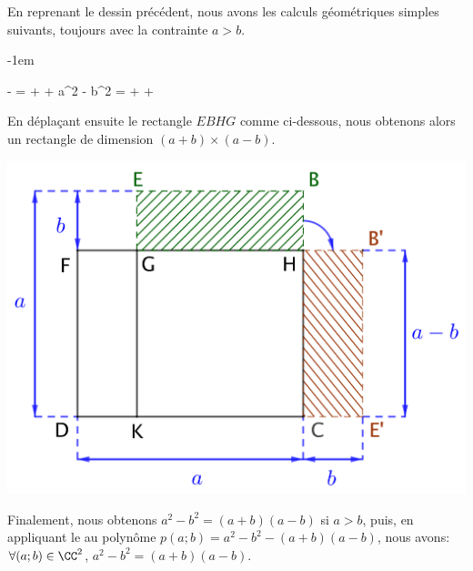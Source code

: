 \begin{example}
	En reprenant le dessin précédent, nous avons les calculs géométriques simples suivants, toujours avec la contrainte $a > b$.

	\smallskip
	\leavevmode\kern-1em%
	\begin{stepcalc}[style=ar*, ope={\iff}]
    	 -  =  +  + 
	\explnext{}
    	a^2 - b^2 =  +  + 
	\end{stepcalc}
	\smallskip

	En déplaçant ensuite le rectangle $EBHG$ comme ci-dessous, nous obtenons alors un rectangle de dimension $(a+b) \times (a-b)$. 

	\begin{center}
		\includegraphics[scale = .7]{a^2-b^2.png}
	\end{center}

	Finalement, nous obtenons $a^2 - b^2 = (a+b)(a-b)$ si $a > b$,
	puis,
	en appliquant le  au polynôme $p(a ; b) = a^2 - b^2 - (a+b)(a-b)$,
	nous avons:
	$\forall (a ; b) \in \CC^2$, $a^2 - b^2 = (a+b)(a-b)$.
\end{example}




